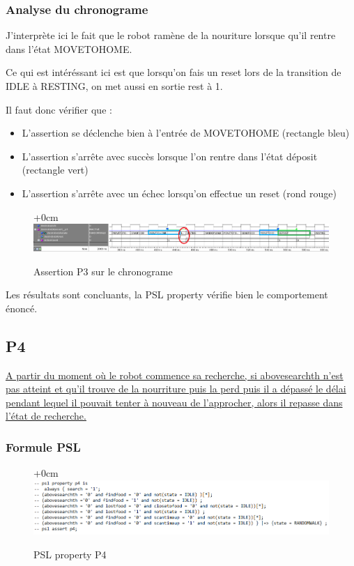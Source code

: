 \documentclass{article}
\newcommand{\sautligne}{
\textbf{\vspace{5mm}}
}
\begin{document}
\begin{landscape}
\subsubsection{Analyse du chronograme}
J'interprète ici le fait que le robot ramène de la nouriture lorsque qu'il rentre dans l'état MOVETOHOME.
\sautligne

Ce qui est intéréssant ici est que lorsqu'on fais un reset lors de la transition de IDLE à RESTING, on met aussi en sortie rest à 1. 



Il faut donc vérifier que :

\begin{itemize}
\item  L'assertion se déclenche bien à l'entrée de MOVETOHOME (rectangle bleu)
\item L'assertion s'arrête avec succès lorsque l'on rentre dans l'état déposit (rectangle vert)
\item L'assertion s'arrête avec un échec lorsqu'on effectue un reset (rond rouge)
\end{itemize} 


\begin{figure}[!h]
\advance\leftskip+0cm
\includegraphics[scale=0.5]{PSL/P3-1.PNG}
\caption{Assertion P3 sur le chronograme }
\end{figure}


Les résultats sont concluants, la PSL property vérifie bien le comportement énoncé.

\newpage

\subsection{P4}
\uline{A partir du moment où le robot commence sa recherche, si abovesearchth n'est pas
atteint et qu'il trouve de la nourriture puis la perd puis il a dépassé le délai pendant lequel
il pouvait tenter à nouveau de l'approcher, alors il repasse dans l'état de recherche.}
\subsubsection{Formule PSL }
\begin{figure}[!h]
\advance\leftskip+0cm
\includegraphics[scale=0.4]{PSL/P4.PNG}
\caption{PSL property P4}
\end{figure}


\end{landscape}
\end{document}
